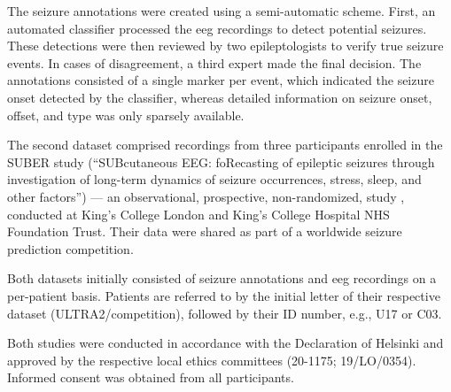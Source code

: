 The seizure annotations were created using a semi-automatic scheme. 
First, an automated classifier \parencite{furbass_automatic_2017} processed the \gls{eeg} recordings to detect potential seizures. 
These detections were then reviewed by two epileptologists to verify true seizure events. 
In cases of disagreement, a third expert made the final decision. 
The annotations consisted of a single marker per event, which indicated the seizure onset detected by the classifier, whereas detailed information on seizure onset, offset, and type was only sparsely available. 

The second dataset comprised recordings from three participants enrolled in the SUBER study (“SUBcutaneous EEG: foRecasting of epileptic seizures through
investigation of long-term dynamics of seizure occurrences, stress, sleep, and other factors”)
— an observational, prospective, non-randomized, study \parencite{viana_real-world_2025}, conducted at King’s College London and King’s College Hospital NHS Foundation Trust.  
Their data were shared as part of a worldwide seizure prediction competition. 

Both datasets initially consisted of seizure annotations and \gls{eeg} recordings on a per-patient basis. 
Patients are referred to by the initial letter of their respective dataset (ULTRA2/competition), followed by their ID number, e.g., U17 or C03.

Both studies were conducted in accordance with the Declaration of Helsinki and approved by the respective local ethics committees (20-1175; 19/LO/0354). 
Informed consent was obtained from all participants.

 

